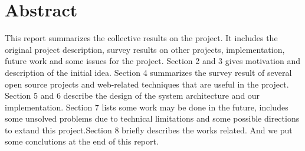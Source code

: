\section{Abstract}

This report summarizes the collective results on the project. It includes the original project description, survey results on other projects, implementation, future work and some issues for the project.
Section 2 and 3 gives motivation and description of the initial idea. Section 4 summarizes the survey result of several open source projects and web-related techniques that are useful in the project.
Section 5 and 6 describe the design of the system architecture and our implementation. Section 7 lists some work may be done in the future, includes some unsolved problems due to technical limitations and some possible directions to extand this project.Section 8 briefly describes the works related. And we put some conclutions at the end of this report.